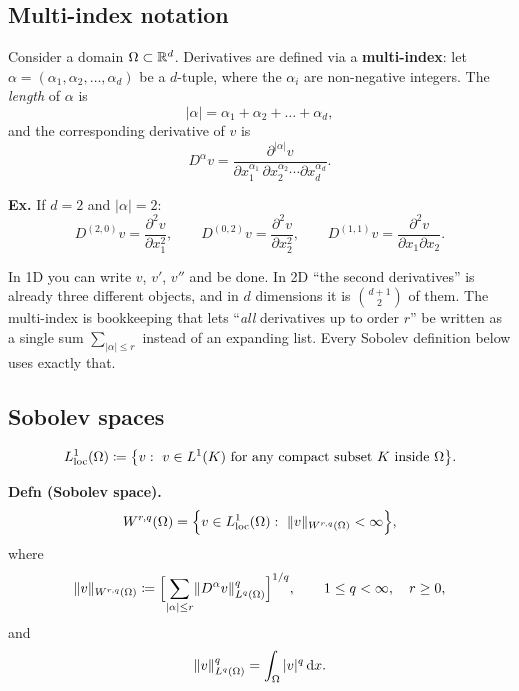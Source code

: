 \subsection*{Multi-index notation}

Consider a domain $\Omega\subset\mathbb{R}^{d}$. Derivatives are defined via a
\textbf{multi-index}: let $\alpha=(\alpha_{1},\alpha_{2},\dots,\alpha_{d})$ be a
$d$-tuple, where the $\alpha_{i}$ are non-negative integers. The \emph{length}
of $\alpha$ is
\begin{equation}\label{eq:l13mlen}
  |\alpha|=\alpha_{1}+\alpha_{2}+\dots+\alpha_{d},
\end{equation}
and the corresponding derivative of $v$ is
\begin{equation}\label{eq:l13Dalpha}
  D^{\alpha}v=\frac{\partial^{|\alpha|}v}
       {\partial x_{1}^{\alpha_{1}}\,\partial x_{2}^{\alpha_{2}}\cdots
        \partial x_{d}^{\alpha_{d}}} .
\end{equation}

\noindent
\textbf{Ex.} If $d=2$ and $|\alpha|=2$:
\[
  D^{(2,0)}v=\frac{\partial^{2}v}{\partial x_{1}^{2}},\qquad
  D^{(0,2)}v=\frac{\partial^{2}v}{\partial x_{2}^{2}},\qquad
  D^{(1,1)}v=\frac{\partial^{2}v}{\partial x_{1}\partial x_{2}} .
\]

\begin{intuition}
In 1D you can write $v$, $v'$, $v''$ and be done. In 2D ``the second
derivatives'' is already three different objects, and in $d$ dimensions it is
$\binom{d+1}{2}$ of them. The multi-index is bookkeeping that lets
``\emph{all} derivatives up to order $r$'' be written as a single sum
$\sum_{|\alpha|\le r}$ instead of an expanding list. Every Sobolev definition
below uses exactly that.
\end{intuition}

\subsection*{Sobolev spaces}

\begin{equation}\label{eq:l13Lloc}
  L^{1}_{\mathrm{loc}}(\Omega)\coloneqq\bigl\{v:\ v\in L^{1}(K)
  \text{ for any compact subset } K \text{ inside } \Omega\bigr\} .
\end{equation}

\noindent
\textbf{Defn (Sobolev space).}
\begin{equation}\label{eq:l13Wrq}
  W^{r,q}(\Omega)=\Bigl\{v\in L^{1}_{\mathrm{loc}}(\Omega):\
  \lVert v\rVert_{W^{r,q}(\Omega)}<\infty\Bigr\},
\end{equation}
where
\begin{equation}\label{eq:l13Wnorm}
  \lVert v\rVert_{W^{r,q}(\Omega)}\coloneqq
  \Bigl[\sum_{|\alpha|\le r}\lVert D^{\alpha}v\rVert^{q}_{L^{q}(\Omega)}\Bigr]^{1/q},
  \qquad 1\le q<\infty,\quad r\ge0,
\end{equation}
and
\begin{equation}\label{eq:l13Lqnorm}
  \lVert v\rVert^{q}_{L^{q}(\Omega)}=\int_{\Omega}|v|^{q}\,\mathrm{d} x .
\end{equation}

